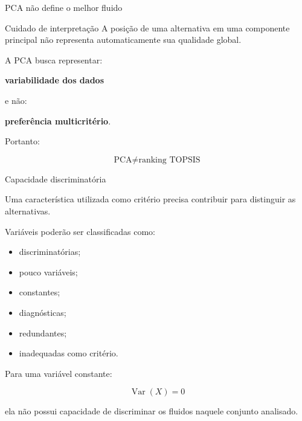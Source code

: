 \begin{frame}{PCA não define o melhor fluido}

    \begin{alertblock}{Cuidado de interpretação}
        A posição de uma alternativa em uma componente principal não
        representa automaticamente sua qualidade global.
    \end{alertblock}

    \vspace{0.4cm}

    A PCA busca representar:

    \begin{center}
        \textbf{variabilidade dos dados}
    \end{center}

    e não:

    \begin{center}
        \textbf{preferência multicritério}.
    \end{center}

    \vspace{0.3cm}

    Portanto:

    \[
    \text{PCA}
    \neq
    \text{ranking TOPSIS}
    \]

\end{frame}



\begin{frame}{Capacidade discriminatória}

    Uma característica utilizada como critério precisa contribuir para
    distinguir as alternativas.

    \vspace{0.3cm}

    Variáveis poderão ser classificadas como:

    \begin{itemize}
        \item discriminatórias;
        \item pouco variáveis;
        \item constantes;
        \item diagnósticas;
        \item redundantes;
        \item inadequadas como critério.
    \end{itemize}

    \vspace{0.3cm}

    Para uma variável constante:

    \[
    \operatorname{Var}(X)=0
    \]

    ela não possui capacidade de discriminar os fluidos naquele conjunto
    analisado.

\end{frame}


